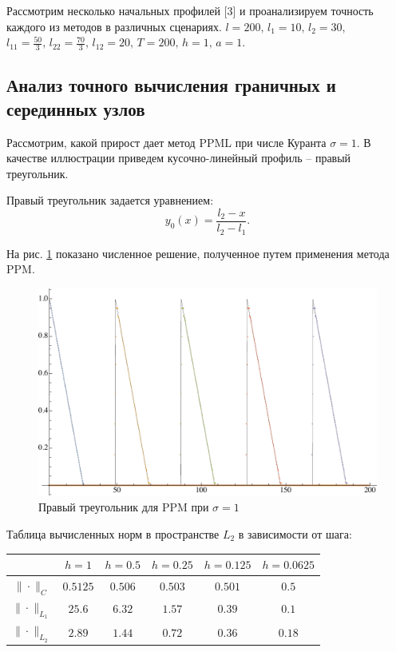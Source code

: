 \documentclass[12pt,a4paper]{article}
\newcommand{\picref}[1]{рис. \ref{#1}}
\begin{document}
    Рассмотрим несколько начальных профилей [3] и проанализируем точность каждого из методов в различных сценариях. $ l = 200,\, l_1 = 10,\, l_2 = 30,$
    \noindent $ l_{11} = \frac{50}{3},\, l_{22} = \frac{70}{3},\, l_{12} = 20,\, T = 200,\, h = 1,\, a = 1$.

    \subsection{Анализ точного вычисления граничных и серединных узлов}

    Рассмотрим, какой прирост дает метод PPML при числе Куранта $ \sigma = 1 $. В качестве иллюстрации приведем кусочно-линейный профиль -- правый треугольник.

    \pagebreak

    Правый треугольник задается уравнением:
    \[
            y_0(x) = \dfrac{l_2 - x}{l_2 - l_1}.
    \]

    На \picref{fig:ppm_rightTriangle_1} показано численное решение, полученное путем применения метода PPM. 

     \begin{figure}[h]
        \centering
        \includegraphics[width=\textwidth]{sigma=1./advectionPPM_rightTriangle.pdf}
        \caption{Правый треугольник для PPM при $ \sigma = 1 $}
        \label{fig:ppm_rightTriangle_1}
    \end{figure}

    Таблица вычисленных норм в пространстве $ L_2 $ в зависимости от шага:

    \begin{center}
        \begin{tabular}{ |c|c|c|c|c|c| } 
         \hline
          & $ h=1 $ &  $ h=0.5$ &  $ h=0.25 $ &  $ h=0.125 $ &  $ h=0.0625 $ \\ 
         \hline
         $\| \cdot \|_{C}$ & $0.5125$ & $0.506$ & $0.503$ & $0.501$ & $0.5$
         \\
         \hline
         $\| \cdot \|_{L_1}$ & $25.6$ & $6.32$ & $1.57$ & $0.39$ & $0.1$
         \\
         \hline
         $\| \cdot \|_{L_2}$ & $2.89$ & $1.44$ & $0.72$ & $0.36$ & $0.18$ \\
         \hline 
        \end{tabular}
    \end{center}
\end{document}
